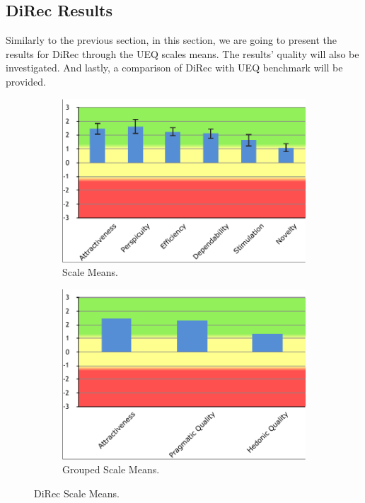 \subsection{DiRec Results}
Similarly to the previous section, in this section, we are going to present the
results for DiRec through the UEQ scales means. The results' quality will also
be investigated. And lastly, a comparison of DiRec with UEQ benchmark will be
provided.
\begin{figure}[!htbp]
\centering
\begin{subfigure}[b]{0.45\textwidth}
\includegraphics[width=\textwidth]{figures/direc-results}
\caption{Scale Means.}
\label{fig:figure516a}
\end{subfigure}
\begin{subfigure}[b]{0.45\textwidth}
\includegraphics[width=\textwidth]{figures/direc-results2}
\caption{Grouped Scale Means.}
\label{fig:figure516b}
\end{subfigure}
\caption{DiRec Scale Means.}
\label{fig:figure516}
\end{figure}
